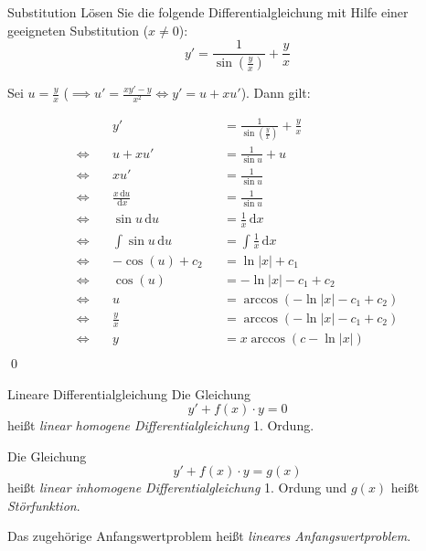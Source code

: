 \documentclass[german]{../spicker}
\renewcommand{\d}{\,\mathrm{d}}
\renewcommand{\abs}[1]{\left| #1 \right|}
\begin{document}
\begin{example}{Substitution}
    Lösen Sie die folgende Differentialgleichung mit Hilfe einer geeigneten Substitution ($x \neq 0$):
    $$
        y' = \frac{1}{\sin\left(\frac{y}{x}\right)} + \frac{y}{x}
    $$
    \exampleseparator

    Sei $u = \frac{y}{x}$ ($\implies u' = \frac{xy' - y}{x^2} \iff y' = u + xu'$). Dann gilt:

    $$
        \begin{aligned}
                       & y'                  &  & = \frac{1}{\sin\left(\frac{y}{x}\right)} + \frac{y}{x} \\
            \iff \quad & u + xu'             &  & = \frac{1}{\sin u} + u                                 \\
            \iff \quad & xu'                 &  & = \frac{1}{\sin u}                                     \\
            \iff \quad & \frac{x \d u}{\d x} &  & = \frac{1}{\sin u}                                     \\
            \iff \quad & \sin u \d u         &  & = \frac{1}{x} \d x                                     \\
            \iff \quad & \int \sin u \d u    &  & = \int \frac{1}{x} \d x                                \\
            \iff \quad & -\cos (u) + c_2     &  & = \ln\abs{x} + c_1                                     \\
            \iff \quad & \cos (u)            &  & = -\ln\abs{x} - c_1 + c_2                              \\
            \iff \quad & u                   &  & = \arccos(-\ln\abs{x} - c_1 + c_2)                     \\
            \iff \quad & \frac{y}{x}         &  & = \arccos(-\ln\abs{x} - c_1 + c_2)                     \\
            \iff \quad & y                   &  & = x\arccos(c - \ln\abs{x})                             \\
        \end{aligned}
    $$\qed
\end{example}

\begin{defi}{Lineare Differentialgleichung}
    Die Gleichung
    $$
        y' + f(x) \cdot y = 0
    $$
    heißt \emph{linear homogene Differentialgleichung} 1. Ordung.

    Die Gleichung
    $$
        y' + f(x) \cdot y = g(x)
    $$
    heißt \emph{linear inhomogene Differentialgleichung} 1. Ordung und
    $g(x)$ heißt \emph{Störfunktion}.

    Das zugehörige Anfangswertproblem heißt \emph{lineares Anfangswertproblem}.
\end{defi}
\end{document}
